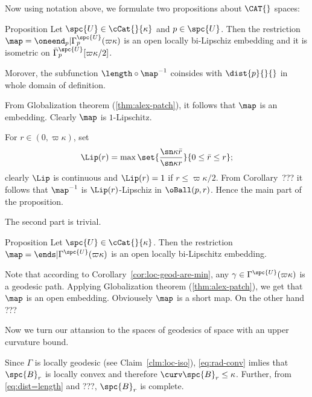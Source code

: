 Now using notation above, 
we formulate two propositions about $\CAT{}$ spaces:

\begin{thm}{Proposition}\label{lem:cat-geos3}
Let $\spc{U}\in\cCat{}{\kappa}$ and $p\in\spc{U}$.
Then the restriction
$\map=\oneend_p|\Gamma^\spc{U}_p(\varpi\kappa)$
is an open locally bi-Lipschiz embedding
and it is isometric on $\bar\Gamma^\spc{U}_p[\varpi\kappa/2]$.

Morover, the subfunction $\length\circ\map^{-1}$ coinsides with $\dist{p}{}{}$ in whole domain of definition. 
\end{thm}

From Globalization theorem (\ref{thm:alex-patch}), it follows that $\map$ is an embedding.
Clearly $\map$ is $1$-Lipschitz.

For $r\in(0,\varpi\kappa)$, 
set 
$$\Lip(r)
=
\max
\set{\frac{\sn\kappa\bar r}{\sn\kappa r}}{0\le\bar r\le r};$$ 
clearly $\Lip$ is continuous 
and $\Lip(r)=1$ if $r\le\varpi\kappa/2$.
From Corollary~??? it follows that $\map^{-1}$ is 
$\Lip(r)$-Lipschiz in $\oBall(p,r)$.
Hence the main part of the proposition.

The second part is trivial.
\qeds

\begin{thm}{Proposition}\label{lem:cat-geos2}
Let $\spc{U}\in\cCat{}{\kappa}$.
Then the restriction $\map=\ends|\Gamma^\spc{U}(\varpi\kappa)$
is an open locally bi-Lipschitz embedding.
\end{thm}

Note that according to Corollary~\ref{cor:loc-geod-are-min}, 
any $\gamma\in\Gamma^\spc{U}(\varpi\kappa)$ is a geodesic path.
Applying Globalization theorem (\ref{thm:alex-patch}),
we get that $\map$ is an open embedding.
Obviousely $\map$ is a short map.
On the other hand ???%
\qeds


Now we turn our attansion to the spaces of geodesics of space with an upper curvature bound.









Since $\Gamma$ is locally geodesic (see Claim~\ref{clm:loc-iso}),
\ref{eq:rad-conv} imlies that $\spc{B}_r$ is locally convex and therefore $\curv\spc{B}_r\le\kappa$.
Further, from \ref{eq:dist=length} and ???, $\spc{B}_r$ is complete.



